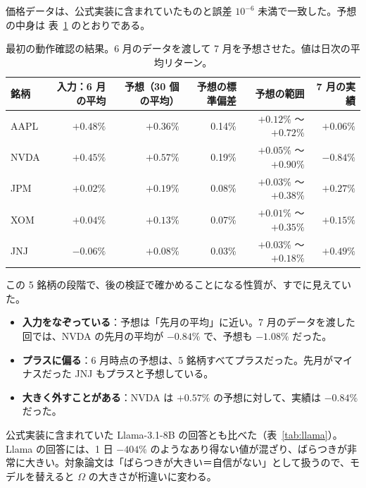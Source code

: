 \documentclass[xelatex,ja=standard,jafont=hiragino-pron,a4paper,10pt]{bxjsreport}
\newcommand{\tabref}[1]{表~\ref{#1}}
\begin{document}
価格データは、公式実装に含まれていたものと誤差 $10^{-6}$ 未満で一致した。予想の中身は \tabref{tab:poc5} のとおりである。

\begin{table}[htbp]
\centering
\caption{最初の動作確認の結果。6 月のデータを渡して 7 月を予想させた。値は日次の平均リターン。}
\label{tab:poc5}
\small
\begin{tabular}{lrrrrr}
\toprule
銘柄 & 入力：6 月の平均 & 予想（30 個の平均） & 予想の標準偏差 & 予想の範囲 & 7 月の実績 \\
\midrule
AAPL & $+0.48\%$ & $+0.36\%$ & 0.14\% & $+0.12\%$ 〜 $+0.72\%$ & $+0.06\%$ \\
NVDA & $+0.45\%$ & $+0.57\%$ & 0.19\% & $+0.05\%$ 〜 $+0.90\%$ & $-0.84\%$ \\
JPM & $+0.02\%$ & $+0.19\%$ & 0.08\% & $+0.03\%$ 〜 $+0.38\%$ & $+0.27\%$ \\
XOM & $+0.04\%$ & $+0.13\%$ & 0.07\% & $+0.01\%$ 〜 $+0.35\%$ & $+0.15\%$ \\
JNJ & $-0.06\%$ & $+0.08\%$ & 0.03\% & $+0.03\%$ 〜 $+0.18\%$ & $+0.49\%$ \\
\bottomrule
\end{tabular}
\end{table}

この 5 銘柄の段階で、後の検証で確かめることになる性質が、すでに見えていた。

\begin{itemize}
\item \textbf{入力をなぞっている}：予想は「先月の平均」に近い。7 月のデータを渡した回では、NVDA の先月の平均が $-0.84\%$ で、予想も $-1.08\%$ だった。
\item \textbf{プラスに偏る}：6 月時点の予想は、5 銘柄すべてプラスだった。先月がマイナスだった JNJ もプラスと予想している。
\item \textbf{大きく外すことがある}：NVDA は $+0.57\%$ の予想に対して、実績は $-0.84\%$ だった。
\end{itemize}

公式実装に含まれていた Llama-3.1-8B の回答とも比べた（\tabref{tab:llama}）。Llama の回答には、1 日 $-404\%$ のようなあり得ない値が混ざり、ばらつきが非常に大きい。対象論文は「ばらつきが大きい＝自信がない」として扱うので、モデルを替えると $\Omega$ の大きさが桁違いに変わる。
\end{document}
